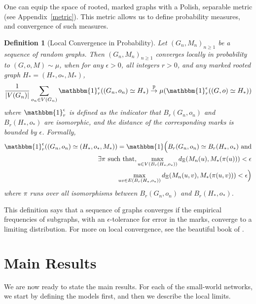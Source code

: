 \documentclass[10pt]{amsart}
\newtheorem{definition}[theorem]{Definition}
\begin{document}
One can equip the space of rooted, marked graphs with a Polish, separable metric (see Appendix~\ref{metric}).
This metric allows us to define probability measures, and convergence of such measures. 

\begin{definition}[Local Convergence in Probability] \label{local-convergence-def}
Let $(G_n, M_n)_{n\geq 1}$ be a sequence of random graphs. Then $(G_n, M_n)_{n\geq 1}$  converges locally in probability to $(G,o, M)\sim \mu$, when for any $\epsilon>0$, all integers $r>0$,  and any marked rooted graph $H_* = (H_*, o_*, M_*)$, 
\begin{equation*}
    \frac{1}{|V(G_n)|}\sum_{o_n\in V(G_n)}   \mathbbm{1}_r^\epsilon((G_n,o_n)\simeq H_*)\overset{\mathbb P}{\to}\mu(  \mathbbm{1}_r^\epsilon((G,o)\simeq H_*))
\end{equation*}
where $ \mathbbm{1}_r^\epsilon$ is defined as the indicator that $B_r(G_n,o_n)$ and $B_r(H_*,o_*)$ are isomorphic, and the distance of the corresponding marks is bounded by $\epsilon$. Formally, 
\begin{align*} 
\mathbbm{1}_r^\epsilon((G_n,o_n)\simeq (H_*, o_*, M_*))=  \mathbbm{1}\Big( B_r(G_n,o_n)\simeq B_r(H_*,o_*) \text{ and}&\\ \exists \pi \text{  such that,}
\max_{u\in V(B_r(H_*,o_*))} d_\Xi(M_n(u),M_*(\pi(u)))< \epsilon
&\\
\max_{uv\in E(B_r(H_*,o_*))} d_\Xi(M_n(u,v),M_*(\pi(u,v)))< \epsilon \Big)&
\end{align*}
where $\pi$ runs over all isomorphisms between $B_r(G_n,o_n)$ and $B_r(H_*,o_*)$.
\end{definition}


This definition says that a sequence of graphs converges if the empirical frequencies of subgraphs, with an $\epsilon$-tolerance for error in the marks, converge to a limiting distribution. For more on local convergence, see the beautiful book of \cite[Chapter 2]{remco}.

\section{Main Results}
We are now ready to state the main results. For each of the small-world networks, we start by defining the models first, and then we describe the local limits.
\end{document}
